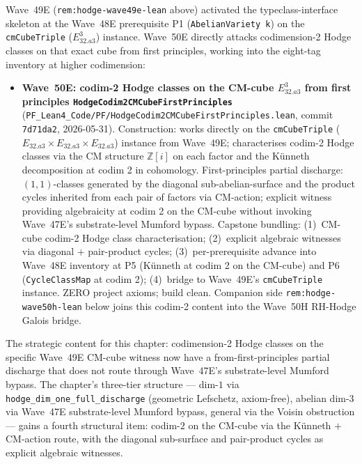 \begin{remark}\label{rem:hodge-wave50e-lean}
Wave~49E (\texttt{rem:hodge-wave49e-lean} above) activated the typeclass-interface skeleton at the Wave~48E prerequisite P1 (\texttt{AbelianVariety k}) on the \texttt{cmCubeTriple} ($E_{32.a3}^3$) instance. Wave~50E directly attacks codimension-2 Hodge classes on that exact cube from first principles, working into the eight-tag inventory at higher codimension:
\begin{itemize}
  \item \textbf{Wave~50E: codim-2 Hodge classes on the CM-cube $E_{32.a3}^3$ from first principles \texttt{HodgeCodim2CMCubeFirstPrinciples}} (\texttt{PF\_Lean4\_Code/PF/HodgeCodim2CMCubeFirstPrinciples.lean}, commit \texttt{7d71da2}, 2026-05-31). Construction: works directly on the \texttt{cmCubeTriple} ($E_{32.a3} \times E_{32.a3} \times E_{32.a3}$) instance from Wave~49E; characterises codim-2 Hodge classes via the CM structure $\mathbb{Z}[i]$ on each factor and the K\"unneth decomposition at codim 2 in cohomology. First-principles partial discharge: $(1, 1)$-classes generated by the diagonal sub-abelian-surface and the product cycles inherited from each pair of factors via CM-action; explicit witness providing algebraicity at codim 2 on the CM-cube without invoking Wave~47E's substrate-level Mumford bypass. Capstone bundling: (1)~CM-cube codim-2 Hodge class characterisation; (2)~explicit algebraic witnesses via diagonal $+$ pair-product cycles; (3)~per-prerequisite advance into Wave~48E inventory at P5 (K\"unneth at codim 2 on the CM-cube) and P6 (\texttt{CycleClassMap} at codim 2); (4)~bridge to Wave~49E's \texttt{cmCubeTriple} instance. ZERO project axioms; build clean. Companion side \texttt{rem:hodge-wave50h-lean} below joins this codim-2 content into the Wave~50H RH-Hodge Galois bridge.
\end{itemize}
The strategic content for this chapter: codimension-2 Hodge classes on the specific Wave~49E CM-cube witness now have a from-first-principles partial discharge that does not route through Wave~47E's substrate-level Mumford bypass. The chapter's three-tier structure --- dim-$1$ via \texttt{hodge\_dim\_one\_full\_discharge} (geometric Lefschetz, axiom-free), abelian dim-$3$ via Wave~47E substrate-level Mumford bypass, general via the Voisin obstruction --- gains a fourth structural item: codim-$2$ on the CM-cube via the K\"unneth $+$ CM-action route, with the diagonal sub-surface and pair-product cycles as explicit algebraic witnesses.


\end{remark}
